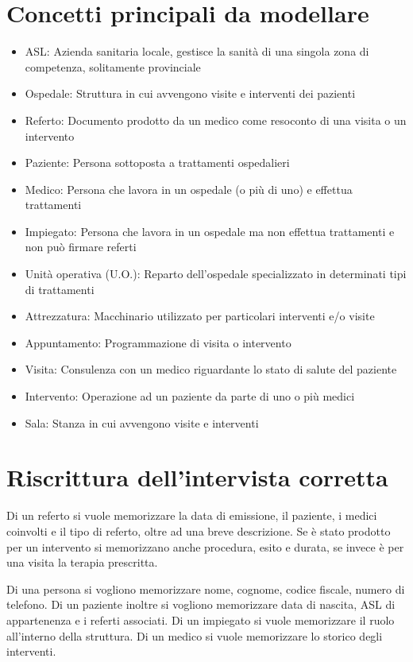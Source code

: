 \documentclass[a4paper,12pt]{report}
\begin{document}
\section{Concetti principali da modellare}
\begin{itemize}
  \item ASL: Azienda sanitaria locale, gestisce la sanità di una singola zona di competenza, solitamente provinciale
  \item Ospedale: Struttura in cui avvengono visite e interventi dei pazienti
  \item Referto: Documento prodotto da un medico come resoconto di una visita o un intervento
  \item Paziente: Persona sottoposta a trattamenti ospedalieri
  \item Medico: Persona che lavora in un ospedale (o più di uno) e effettua trattamenti
  \item Impiegato: Persona che lavora in un ospedale ma non effettua trattamenti e non può firmare referti
  \item Unità operativa (U.O.): Reparto dell'ospedale specializzato in determinati tipi di trattamenti
  \item Attrezzatura: Macchinario utilizzato per particolari interventi e/o visite
  \item Appuntamento: Programmazione di visita o intervento
  \item Visita: Consulenza con un medico riguardante lo stato di salute del paziente
  \item Intervento: Operazione ad un paziente da parte di uno o più medici
  \item Sala: Stanza in cui avvengono visite e interventi
\end{itemize}
\section{Riscrittura dell'intervista corretta}
Di un referto si vuole memorizzare la data di emissione, il paziente, i medici coinvolti e il tipo di referto, oltre ad una breve descrizione.
Se è stato prodotto per un intervento si memorizzano anche procedura, esito e durata, se invece è per una visita la terapia prescritta.

Di una persona si vogliono memorizzare nome, cognome, codice fiscale, numero di telefono.
Di un paziente inoltre si vogliono memorizzare data di nascita, ASL di appartenenza e i referti associati.
Di un impiegato si vuole memorizzare il ruolo all'interno della struttura.
Di un medico si vuole memorizzare lo storico degli interventi.
\end{document}

